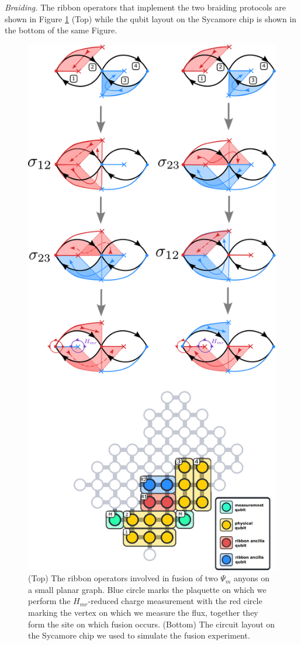 \documentclass[two column]{article}
\begin{document}
\emph{Braiding.} The ribbon operators that implement the two braiding protocols are shown in Figure \ref{fig:braiding_setup} (Top) while the qubit layout on the Sycamore chip is shown in the bottom of the same Figure.
\begin{figure}
	\centering
	\includegraphics[width=\linewidth]{Figures/braiding_setup.pdf}
	\caption{(Top) The ribbon operators involved in fusion of two $\Psi_m$ anyons on a small planar graph. Blue circle marks the plaquette on which we perform the $H_{mr}$-reduced charge measurement with the red circle marking the vertex on which we measure the flux, together they form the site on which fusion occurs. (Bottom) The circuit layout on the Sycamore chip we used to simulate the fusion experiment.}
	\label{fig:braiding_setup}
\end{figure}
\end{document}
